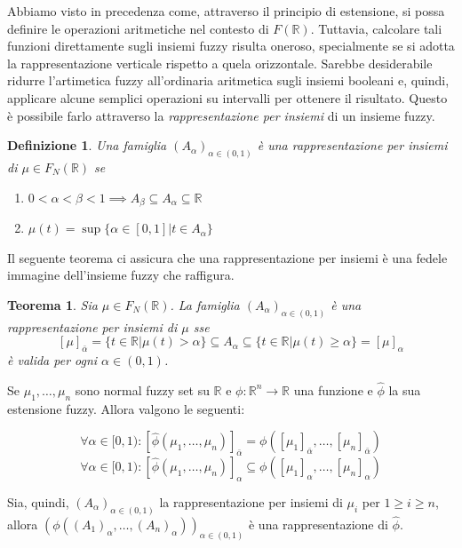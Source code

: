 \documentclass[10pt,a4paper]{article}
\newtheorem{definition}{Definizione}
\newtheorem{theorem}{Teorema}
\begin{document}
Abbiamo visto in precedenza come, attraverso il principio di estensione, si possa definire le operazioni aritmetiche nel contesto di $F(\mathbb{R})$. Tuttavia, calcolare tali funzioni direttamente sugli insiemi fuzzy risulta oneroso, specialmente se si adotta la rappresentazione verticale rispetto a quela orizzontale. Sarebbe desiderabile ridurre l'artimetica fuzzy all'ordinaria aritmetica sugli insiemi booleani e, quindi, applicare alcune semplici operazioni su intervalli per ottenere il risultato. Questo è possibile farlo attraverso la \emph{rappresentazione per insiemi} di un insieme fuzzy.

\newpage

\begin{definition}
Una famiglia $(A_\alpha)_{\alpha \in (0,1)}$ è una \emph{rappresentazione per insiemi} di $\mu \in F_N(\mathbb{R})$ se
\begin{enumerate}
\item{$0 < \alpha < \beta < 1 \implies A_\beta \subseteq A_\alpha \subseteq \mathbb{R}$}
\item{$\mu(t) = \sup \{ \alpha \in [0,1] | t \in A_\alpha \} $}
\end{enumerate} 
\end{definition}

Il seguente teorema ci assicura che una rappresentazione per insiemi è una fedele immagine dell'insieme fuzzy che raffigura.

\begin{theorem}
Sia $\mu \in F_N(\mathbb{R})$. La famiglia $(A_\alpha)_{\alpha \in (0,1)}$ è una rappresentazione per insiemi di $\mu$ sse 
$$
[\mu]_{\bar{\alpha}} = \{ t \in \mathbb{R} | \mu(t) > \alpha \} \subseteq A_\alpha \subseteq \{ t \in \mathbb{R} | \mu(t) \geq \alpha \} = [\mu]_\alpha
$$
è valida per ogni $\alpha \in (0,1)$.
\end{theorem}

Se $\mu_1, \dots, \mu_n$ sono normal fuzzy set su $\mathbb{R}$ e $\phi: \mathbb{R}^n \to \mathbb{R}$ una funzione e $\hat{\phi}$ la sua estensione fuzzy. Allora valgono le seguenti:

$$
\forall \alpha \in [0,1) : [\hat{\phi}(\mu_1,\dots,\mu_n)]_{\bar{\alpha}} = \phi([\mu_1]_{\bar{\alpha}}, \dots, [\mu_n]_{\bar{\alpha}})
$$
$$
\forall \alpha \in [0,1) : [\hat{\phi}(\mu_1,\dots,\mu_n)]_\alpha \subseteq \phi([\mu_1]_\alpha, \dots, [\mu_n]_\alpha)
$$

Sia, quindi, $(A_\alpha)_{\alpha \in (0,1)}$ la rappresentazione per insiemi di $\mu_i$ per $1 \geq i \geq n$, allora $(\phi((A_1)_\alpha, \dots, (A_n)_\alpha))_{\alpha \in (0,1)}$ è una rappresentazione di $\hat{\phi}$. 
\end{document}
